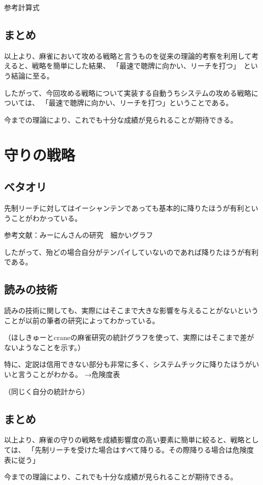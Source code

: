 参考計算式

\subsection{まとめ}

以上より、麻雀において攻める戦略と言うものを従来の理論的考察を利用して考えると、戦略を簡単にした結果、
「最速で聴牌に向かい、リーチを打つ」　という結論に至る。

したがって、今回攻める戦略について実装する自動うちシステムの攻める戦略については、
「最速で聴牌に向かい、リーチを打つ」ということである。

今までの理論により、これでも十分な成績が見られることが期待できる。

\section{守りの戦略}

\subsection{ベタオリ}

先制リーチに対してはイーシャンテンであっても基本的に降りたほうが有利ということがわかっている。

参考文献：みーにんさんの研究　細かいグラフ

したがって、殆どの場合自分がテンパイしていないのであれば降りたほうが有利である。

\subsection{読みの技術}

読みの技術に関しても、実際にはそこまで大きな影響を与えることがないということが以前の筆者の研究によってわかっている。

（ほしきゅーとcraneの麻雀研究の統計グラフを使って、実際にはそこまで差がないようなことを示す。）

特に、定説は信用できない部分も非常に多く、システムチックに降りたほうがいいと言うことがわかる。
→危険度表

（同じく自分の統計から）

\subsection{まとめ}

以上より、麻雀の守りの戦略を成績影響度の高い要素に簡単に絞ると、戦略としては、
「先制リーチを受けた場合はすべて降りる。その際降りる場合は危険度表に従う」

今までの理論により、これでも十分な成績が見られることが期待できる。